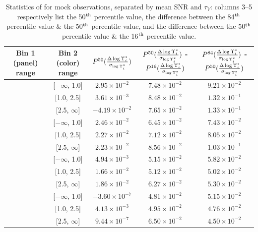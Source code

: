 \begin{table}[p]
    \centering
    \begin{tabular}{||c|c|c|c|c||} \hline \hline
        Bin 1 (panel) range & Bin 2 (color) range & $P^{50}(\frac{\Delta \log \Upsilon^*_{i}}{\sigma_{\log \Upsilon^*_{i}}})$ & $P^{50}(\frac{\Delta \log \Upsilon^*_{i}}{\sigma_{\log \Upsilon^*_{i}}})$  - $P^{16}(\frac{\Delta \log \Upsilon^*_{i}}{\sigma_{\log \Upsilon^*_{i}}})$ & $P^{84}(\frac{\Delta \log \Upsilon^*_{i}}{\sigma_{\log \Upsilon^*_{i}}})$ - $P^{50}(\frac{\Delta \log \Upsilon^*_{i}}{\sigma_{\log \Upsilon^*_{i}}})$ \\ \hline \hline
        [$-\infty$, 2.0] & [$-\infty$, 1.0] & $2.95 \times 10^{-2}$ & $7.48 \times 10^{-2}$ & $9.21 \times 10^{-2}$ \\ \hline
        [$-\infty$, 2.0] & [1.0, 2.5] & $3.61 \times 10^{-3}$ & $8.48 \times 10^{-2}$ & $1.32 \times 10^{-1}$ \\ \hline
        [$-\infty$, 2.0] & [2.5, $\infty$] & $-4.19 \times 10^{-2}$ & $7.65 \times 10^{-2}$ & $1.33 \times 10^{-1}$ \\ \hline
        [2.0, 10.0] & [$-\infty$, 1.0] & $2.46 \times 10^{-2}$ & $6.45 \times 10^{-2}$ & $7.43 \times 10^{-2}$ \\ \hline
        [2.0, 10.0] & [1.0, 2.5] & $2.27 \times 10^{-2}$ & $7.12 \times 10^{-2}$ & $8.05 \times 10^{-2}$ \\ \hline
        [2.0, 10.0] & [2.5, $\infty$] & $2.23 \times 10^{-2}$ & $8.56 \times 10^{-2}$ & $1.03 \times 10^{-1}$ \\ \hline
        [10.0, 20.0] & [$-\infty$, 1.0] & $4.94 \times 10^{-3}$ & $5.15 \times 10^{-2}$ & $5.82 \times 10^{-2}$ \\ \hline
        [10.0, 20.0] & [1.0, 2.5] & $1.66 \times 10^{-2}$ & $5.12 \times 10^{-2}$ & $5.02 \times 10^{-2}$ \\ \hline
        [10.0, 20.0] & [2.5, $\infty$] & $1.86 \times 10^{-2}$ & $6.27 \times 10^{-2}$ & $5.30 \times 10^{-2}$ \\ \hline
        [20.0, $\infty$] & [$-\infty$, 1.0] & $-3.60 \times 10^{-7}$ & $4.81 \times 10^{-2}$ & $5.15 \times 10^{-2}$ \\ \hline
        [20.0, $\infty$] & [1.0, 2.5] & $4.13 \times 10^{-3}$ & $4.95 \times 10^{-2}$ & $4.76 \times 10^{-2}$ \\ \hline
        [20.0, $\infty$] & [2.5, $\infty$] & $9.44 \times 10^{-7}$ & $6.50 \times 10^{-2}$ & $4.50 \times 10^{-2}$ \\ \hline
    \end{tabular}
    \caption[Statistics of  for mock observations, separated by mean SNR and $\tau_V$]{\fixspacing Statistics of  for mock observations, separated by mean SNR and $\tau_V$: columns 3--5 respectively list the 50$^{\rm th}$ percentile value, the difference between the 84$^{\rm th}$ percentile value \& the 50$^{\rm th}$ percentile value, and the difference between the 50$^{\rm th}$ percentile value \& the 16$^{\rm th}$ percentile value.}
    \label{tab:mocks_snr_tauV_devMLi}
\end{table}


